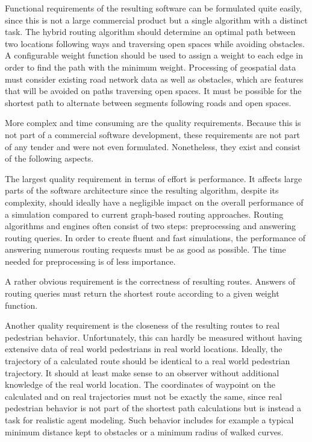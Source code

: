 		Functional requirements of the resulting software can be formulated quite easily, since this is not a large commercial product but a single algorithm with a distinct task.
		The hybrid routing algorithm should determine an optimal path between two locations following ways and traversing open spaces while avoiding obstacles.
		A configurable weight function should be used to assign a weight to each edge in order to find the path with the minimum weight.
		Processing of geospatial data must consider existing road network data as well as obstacles, which are features that will be avoided on paths traversing open spaces.
		It must be possible for the shortest path to alternate between segments following roads and open spaces.
		
		More complex and time consuming are the quality requirements.
		Because this is not part of a commercial software development, these requirements are not part of any tender and were not even formulated.
		Nonetheless, they exist and consist of the following aspects.
	
		The largest quality requirement in terms of effort is performance.
		It affects large parts of the software architecture since the resulting algorithm, despite its complexity, should ideally have a negligible impact on the overall performance of a simulation compared to current graph-based routing approaches.
		Routing algorithms and engines often consist of two steps: preprocessing and answering routing queries.
		In order to create fluent and fast simulations, the performance of answering numerous routing requests must be as good as possible.
		The time needed for preprocessing is of less importance.
		
		A rather obvious requirement is the correctness of resulting routes.
		Answers of routing queries must return the shortest route according to a given weight function.
		
		Another quality requirement is the closeness of the resulting routes to real pedestrian behavior.
		Unfortunately, this can hardly be measured without having extensive data of real world pedestrians in real world locations.
		Ideally, the trajectory of a calculated route should be identical to a real world pedestrian trajectory.
		It should at least make sense to an observer without additional knowledge of the real world location.
		The coordinates of waypoint on the calculated and on real trajectories must not be exactly the same, since real pedestrian behavior is not part of the shortest path calculations but is instead a task for realistic agent modeling.
		Such behavior includes for example a typical minimum distance kept to obstacles or a minimum radius of walked curves.

